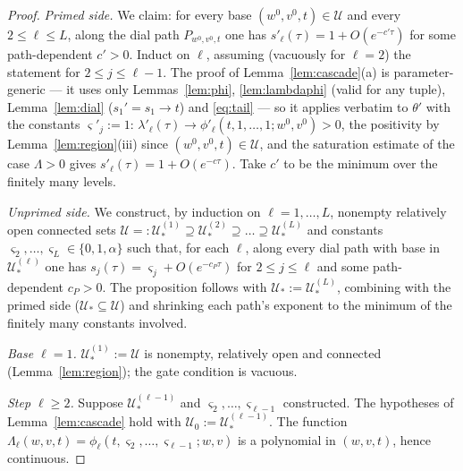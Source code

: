 \documentclass[11pt]{article}
\theoremstyle{definition}
\theoremstyle{remark}
\theoremstyle{plain}
\newcommand{\cU}{\mathcal{U}}
\begin{document}
\begin{proof}
\emph{Primed side.}  We claim: for every base $(w^0,v^0,t)\in\cU$ and every
$2\le\ell\le L$, along the dial path $P_{w^0,v^0,t}$ one has
$s'_\ell(\tau)=1+O(e^{-c'\tau})$ for some path-dependent $c'>0$.  Induct on $\ell$,
assuming (vacuously for $\ell=2$) the statement for $2\le j\le\ell-1$.  The proof of
Lemma~\ref{lem:cascade}(a) is parameter-generic --- it uses only
Lemmas~\ref{lem:phi}, \ref{lem:lambdaphi} (valid for any tuple),
Lemma~\ref{lem:dial} ($s_1'=s_1\to t$) and \eqref{eq:tail} --- so it applies verbatim
to $\theta'$ with the constants $\varsigma'_j:=1$:
$\lambda'_\ell(\tau)\to\phi'_\ell(t,1,\dots,1;w^0,v^0)>0$, the positivity by
Lemma~\ref{lem:region}(iii) since $(w^0,v^0,t)\in\cU$, and the saturation estimate of
the case $\Lambda>0$ gives $s'_\ell(\tau)=1+O(e^{-c\tau})$.  Take $c'$ to be the
minimum over the finitely many levels.

\emph{Unprimed side.}  We construct, by induction on $\ell=1,\dots,L$, nonempty
relatively open connected sets
$\cU=:\cU^{(1)}_*\supseteq\cU^{(2)}_*\supseteq\dots\supseteq\cU^{(L)}_*$ and constants
$\varsigma_2,\dots,\varsigma_L\in\{0,1,\alpha\}$ such that, for each $\ell$, along
every dial path with base in $\cU^{(\ell)}_*$ one has
$s_j(\tau)=\varsigma_j+O(e^{-c_P\tau})$ for $2\le j\le\ell$ and some path-dependent
$c_P>0$.  The proposition follows with $\cU_*:=\cU^{(L)}_*$, combining with the primed
side ($\cU_*\subseteq\cU$) and shrinking each path's exponent to the minimum of the
finitely many constants involved.

\emph{Base $\ell=1$.}  $\cU^{(1)}_*:=\cU$ is nonempty, relatively open and connected
(Lemma~\ref{lem:region}); the gate condition is vacuous.

\emph{Step $\ell\ge2$.}  Suppose $\cU^{(\ell-1)}_*$ and
$\varsigma_2,\dots,\varsigma_{\ell-1}$ constructed.  The hypotheses of
Lemma~\ref{lem:cascade} hold with $\cU_0:=\cU^{(\ell-1)}_*$.  The function
$\Lambda_\ell(w,v,t)=\phi_\ell(t,\varsigma_2,\dots,\varsigma_{\ell-1};w,v)$ is a
polynomial in $(w,v,t)$, hence continuous.


\end{proof}
\end{document}
